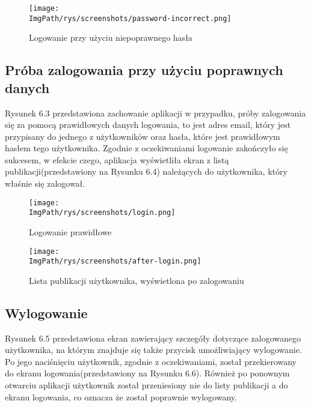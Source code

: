 \documentclass[a4paper,12pt,twoside,openany]{report}
\newcommand{\ImgPath}{.}
\begin{document}
\pagebreak

\begin{figure}[!htbp]
	\begin{center}
		\centering
		\texttt{[image: \\ImgPath/rys/screenshots/password-incorrect.png]}
	\end{center}
	\caption{Logowanie przy użyciu niepoprawnego hasła}
	\label{zrzutLogowaniePoprawne}
\end{figure}

\subsection{Próba zalogowania przy użyciu poprawnych danych}
Rysunek 6.3  przedstawiona zachowanie aplikacji w przypadku, próby zalogowania się za pomocą prawidłowych danych logowania, to jest adres email, który jest przypisany do jednego z użytkowników oraz hasła, które jest prawidłowym hasłem tego użytkownika. Zgodnie z oczekiwaniami logowanie zakończyło się sukcesem, w efekcie czego, aplikacja wyświetliła ekran z listą publikacji(przedstawiony na Rysunku 6.4) należących do użytkownika, który właśnie się zalogował. 

\pagebreak

\begin{figure}[!htbp]
	\begin{center}
		\centering
		\texttt{[image: \\ImgPath/rys/screenshots/login.png]}
	\end{center}
	\caption{Logowanie prawidłowe}
	\label{zrzutLogowaniePoprawne}
\end{figure}

\begin{figure}[!htbp]
	\begin{center}
		\centering
		\texttt{[image: \\ImgPath/rys/screenshots/after-login.png]}
	\end{center}
	\caption{Lista publikacji użytkownika, wyświetlona po zalogowaniu}
	\label{diagramAktywnosciMobDodEdyt}
\end{figure}

\subsection{Wylogowanie}
Rysunek 6.5  przedstawiona ekran zawierający szczegóły dotyczące zalogowanego użytkownika, na którym znajduje się także przycisk umożliwiający wylogowanie. Po jego naciśnięciu użytkownik, zgodnie z oczekiwaniami, został przekierowany do ekranu logowania(przedstawiony na Rysunku 6.6). Również po ponownym otwarciu aplikacji użytkownik został przeniesiony nie do listy publikacji a do ekranu logowania, co oznacza że został poprawnie wylogowany.
\end{document}
